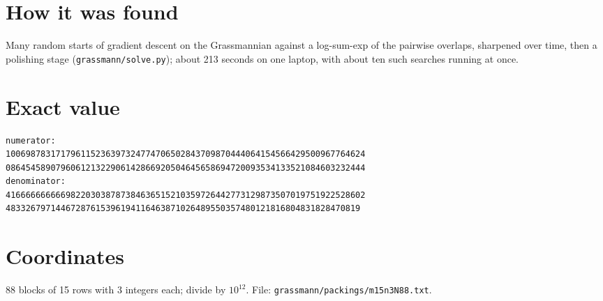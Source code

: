 \documentclass[11pt,a4paper]{article}
\begin{document}
\section{How it was found}
Many random starts of gradient descent on the Grassmannian against a log-sum-exp of the pairwise overlaps, sharpened over time, then a polishing stage (\texttt{grassmann/solve.py}); about 213 seconds on one laptop, with about ten such searches running at once.


\appendix
\section{Exact value}
{\small
\begin{verbatim}
numerator:
100698783171796115236397324774706502843709870444064154566429500967764624
086454589079606121322906142866920504645658694720093534133521084603232444
denominator:
416666666666982203038787384636515210359726442773129873507019751922528602
48332679714467287615396194116463871026489550357480121816804831828470819
\end{verbatim}}

\section{Coordinates}
88 blocks of 15 rows with 3 integers each; divide by $10^{12}$. File: \texttt{grassmann/packings/m15n3N88.txt}.
{\tiny
\begin{multicols}{3}
\end{multicols}}
\end{document}
